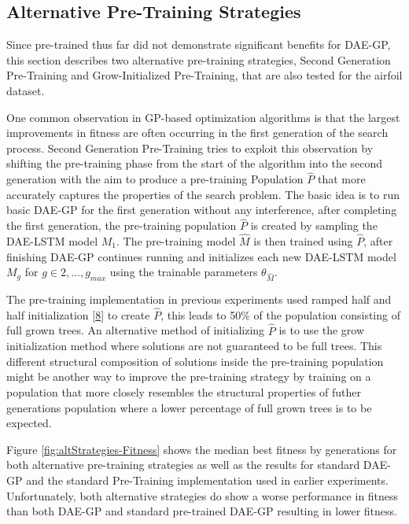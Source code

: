 \documentclass[
  11pt,
]{article}
\begin{document}
\hypertarget{alternative-pre-training-strategies}{%
\subsection{Alternative Pre-Training Strategies}\label{alternative-pre-training-strategies}}

Since pre-trained thus far did not demonstrate significant benefits for DAE-GP, this section describes two alternative pre-training strategies, Second Generation Pre-Training and Grow-Initialized Pre-Training, that are also tested for the airfoil dataset.

One common observation in GP-based optimization algorithms is that the largest improvements in fitness are often occurring in the first generation of the search process. Second Generation Pre-Training tries to exploit this observation by shifting the pre-training phase from the start of the algorithm into the second generation with the aim to produce a pre-training Population \(\hat{P}\) that more accurately captures the properties of the search problem. The basic idea is to run basic DAE-GP for the first generation without any interference, after completing the first generation, the pre-training population \(\hat{P}\) is created by sampling the DAE-LSTM model \(M_1\). The pre-training model \(\hat{M}\) is then trained using \(\hat{P}\), after finishing DAE-GP continues running and initializes each new DAE-LSTM model \(M_g\) for \(g\in{2,...,g_{max}}\) using the trainable parameters \(\theta_{\hat{M}}\).

The pre-training implementation in previous experiments used ramped half and half initialization {[}\protect\hyperlink{ref-Koza1993GeneticP}{8}{]} to create \(\hat{P}\), this leads to 50\% of the population consisting of full grown trees. An alternative method of initializing \(\hat{P}\) is to use the grow initialization method where solutions are not guaranteed to be full trees. This different structural composition of solutions inside the pre-training population might be another way to improve the pre-training strategy by training on a population that more closely resembles the structural properties of futher generations population where a lower percentage of full grown trees is to be expected.

Figure \ref{fig:altStrategies-Fitness} shows the median best fitness by generations for both alternative pre-training strategies as well as the results for standard DAE-GP and the standard Pre-Training implementation used in earlier experiments. Unfortunately, both alternative strategies do show a worse performance in fitness than both DAE-GP and standard pre-trained DAE-GP resulting in lower fitness.
\end{document}
